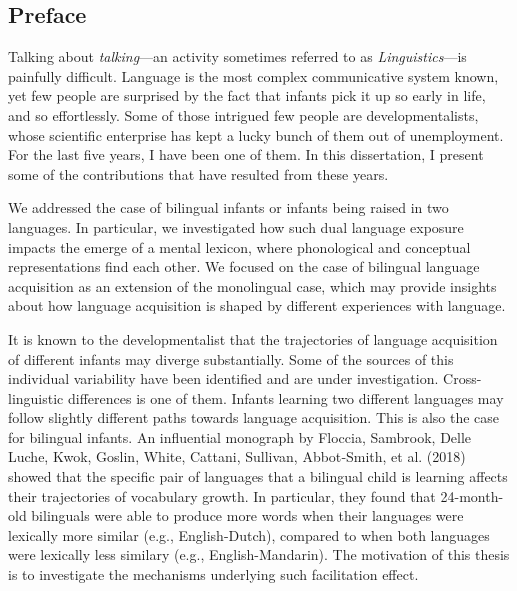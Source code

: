 \documentclass[
  12pt,
  b5paperpaper,
  twoside]{scrreprt}
\begin{document}
\begin{spacing}{1.5}

\clearpage
\chapter*{\sffamily Preface}
\vspace*{\baselineskip}
\normalsize{Talking about \emph{talking}---an activity sometimes
referred to as \emph{Linguistics}---is painfully difficult. Language is
the most complex communicative system known, yet few people are
surprised by the fact that infants pick it up so early in life, and so
effortlessly. Some of those intrigued few people are developmentalists,
whose scientific enterprise has kept a lucky bunch of them out of
unemployment. For the last five years, I have been one of them. In this
dissertation, I present some of the contributions that have resulted
from these years.

We addressed the case of bilingual infants or infants being raised in
two languages. In particular, we investigated how such dual language
exposure impacts the emerge of a mental lexicon, where phonological and
conceptual representations find each other. We focused on the case of
bilingual language acquisition as an extension of the monolingual case,
which may provide insights about how language acquisition is shaped by
different experiences with language.

It is known to the developmentalist that the trajectories of language
acquisition of different infants may diverge substantially. Some of the
sources of this individual variability have been identified and are
under investigation. Cross-linguistic differences is one of them.
Infants learning two different languages may follow slightly different
paths towards language acquisition. This is also the case for bilingual
infants. An influential monograph by Floccia, Sambrook, Delle Luche,
Kwok, Goslin, White, Cattani, Sullivan, Abbot‐Smith, et al. (2018)
showed that the specific pair of languages that a bilingual child is
learning affects their trajectories of vocabulary growth. In particular,
they found that 24-month-old bilinguals were able to produce more words
when their languages were lexically more similar (e.g., English-Dutch),
compared to when both languages were lexically less similary (e.g.,
English-Mandarin). The motivation of this thesis is to investigate the
mechanisms underlying such facilitation effect.

}
\end{spacing}
\end{document}
